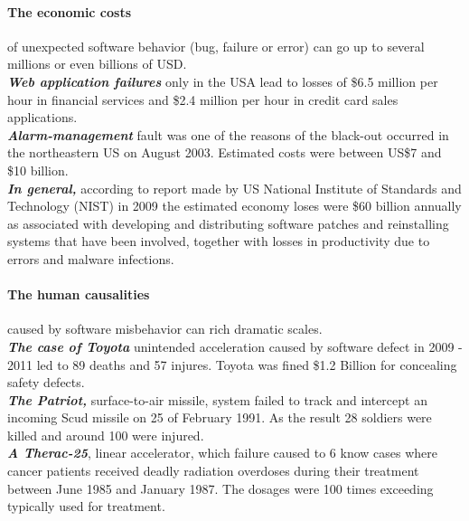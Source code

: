 \paragraph{The economic costs} of unexpected software behavior (bug, failure or error) can go up to several millions or even billions of USD. \\
\textit{\textbf{Web application failures}} only in the USA lead to losses of \$6.5 million per hour in financial services and \$2.4 million per hour in credit card sales applications\cite{Lecture1}. \\
\textit{\textbf{Alarm-management}} fault was one of the reasons of the black-out occurred in the northeastern US on August 2003. Estimated costs were between US\$7 and \$10 billion\cite{costOfErrors}.\\
\textit{\textbf{In general,}} according to report made by US National Institute of Standards and Technology (NIST) in 2009 the estimated economy loses  were \$60 billion annually as associated with developing and distributing software patches and reinstalling systems that have been involved, together with losses in productivity due to errors and malware infections\cite{costOfErrors}.\\


\paragraph{The human causalities} caused by software misbehavior can rich dramatic scales.\\
\textit{\textbf{The case of Toyota}} unintended acceleration caused by software defect  in 2009 - 2011 led to 89 deaths and 57 injures.
Toyota was fined \$1.2 Billion for concealing safety defects\cite{toyota}.\\
\textit{\textbf{The Patriot,}} surface-to-air missile, system failed to track and intercept an incoming Scud missile on 25 of February 1991. As the result 28 soldiers were killed and around 100 were injured\cite{costOfErrors}.\\
\textit{\textbf{A Therac-25}}, linear accelerator, which failure caused to 6 know cases where cancer patients received deadly radiation overdoses during their treatment between June 1985 and January 1987. The dosages were 100 times exceeding typically used for treatment\cite{costOfErrors}\cite{therac}.\\






